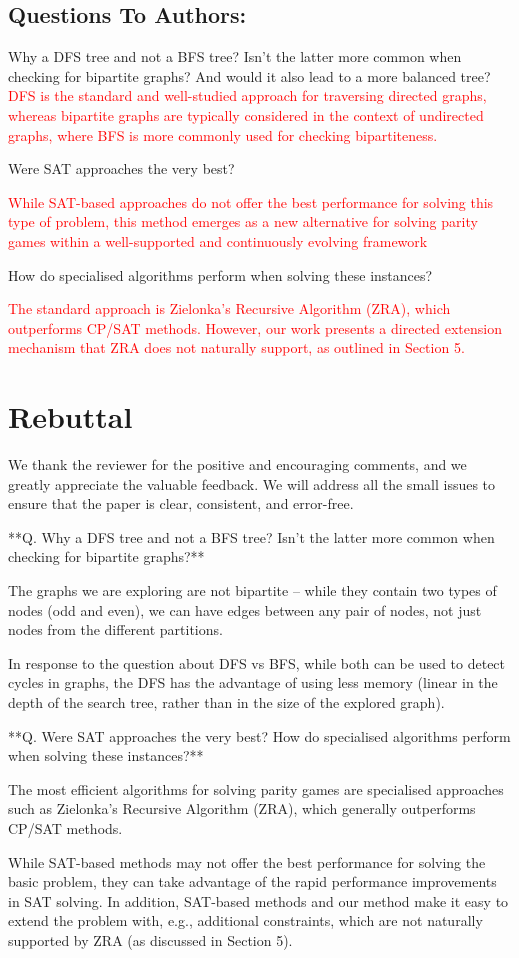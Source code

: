 \documentclass{article}
\begin{document}
\subsection*{Questions To Authors:}
Why a DFS tree and not a BFS tree? Isn't the latter more common when checking for bipartite graphs? And would it also lead to a more balanced tree?\\
\textcolor{red}{DFS is the standard and well-studied approach for traversing directed graphs, whereas bipartite graphs are typically considered in the context of undirected graphs, where BFS is more commonly used for checking bipartiteness.}

Were SAT approaches the very best? 

\textcolor{red}{While SAT-based approaches do not offer the best performance for solving this type of problem, this method emerges as a new alternative for solving parity games within a well-supported and continuously evolving framework}

How do specialised algorithms perform when solving these instances?

\textcolor{red}{The standard approach is Zielonka’s Recursive Algorithm (ZRA), which outperforms CP/SAT methods. However, our work presents a directed extension mechanism that ZRA does not naturally support, as outlined in Section 5.}

\section*{Rebuttal}

We thank the reviewer for the positive and encouraging comments, and we greatly appreciate the valuable feedback. We will address all the small issues to ensure that the paper is clear, consistent, and error-free.

**Q. Why a DFS tree and not a BFS tree?  Isn't the latter more common when checking for bipartite graphs?**

The graphs we are exploring are not bipartite -- while they contain two types of nodes (odd and even), we can have edges between any pair of nodes, not just nodes from the different partitions.

In response to the question about DFS vs BFS, while both can be used to detect cycles in graphs, the DFS has the advantage of using less memory (linear in the depth of the search tree, rather than in the size of the explored graph).

**Q. Were SAT approaches the very best? How do specialised algorithms perform when solving these instances?**

The most efficient algorithms for solving parity games are specialised approaches such as Zielonka’s Recursive Algorithm (ZRA), which generally outperforms CP/SAT methods. 

While SAT-based methods may not offer the best performance for solving the basic problem, they can take advantage of the rapid performance improvements in SAT solving. In addition, SAT-based methods and our method make it easy to extend the problem with, e.g., additional constraints, which are not naturally supported by ZRA (as discussed in Section 5).
\end{document}
